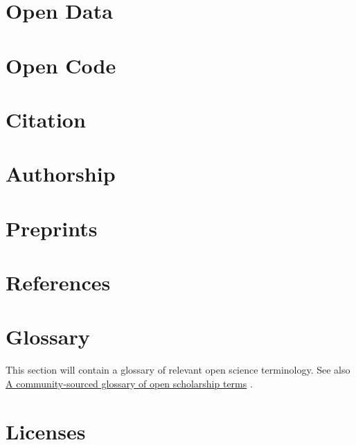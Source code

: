 \documentclass[
  oneside]{book}
\newlength{\cslhangindent}
\newlength{\cslentryspacingunit} %
\newenvironment{CSLReferences}[2] %
 {%
  \setlength{\parindent}{0pt}
  \ifodd #1
  \let\oldpar\par
  \def\par{\hangindent=\cslhangindent\oldpar}
  \fi
  \setlength{\parskip}{#2\cslentryspacingunit}
 }%
 {}
\begin{document}
\hypertarget{open-data-2}{%
\chapter{Open Data}\label{open-data-2}}

\hypertarget{open-code-2}{%
\chapter{Open Code}\label{open-code-2}}

\hypertarget{citation-2}{%
\chapter{Citation}\label{citation-2}}

\hypertarget{authorship-2}{%
\chapter{Authorship}\label{authorship-2}}

\hypertarget{preprints-2}{%
\chapter{Preprints}\label{preprints-2}}

\hypertarget{appendix-appendices}{%
\appendix}


\hypertarget{references}{%
\chapter*{References}\label{references}}

\hypertarget{refs}{}
\begin{CSLReferences}{0}{0}
\end{CSLReferences}

\hypertarget{glossary}{%
\chapter{Glossary}\label{glossary}}

This section will contain a glossary of relevant open science terminology. See also \href{https://doi.org/10.1038/s41562-021-01269-4}{A community-sourced glossary of open scholarship terms} \citep{parsons2022community}.

\hypertarget{licenses}{%
\chapter{Licenses}\label{licenses}}
\end{document}
